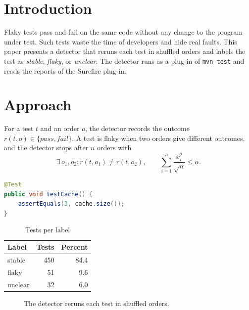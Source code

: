 \section{Introduction}
Flaky tests pass and fail on the same code without any change to the program under test. Such tests waste the
time of developers and hide real faults. This paper presents a detector that reruns each test in shuffled orders
and labels the test as \textit{stable}, \textit{flaky}, or \textit{unclear}. The detector runs as a plug-in of
\texttt{mvn test} and reads the reports of the Surefire plug-in.
\lipsum[1-2]

\section{Approach}
For a test $t$ and an order $o$, the detector records the outcome $r(t, o) \in \{\mathit{pass}, \mathit{fail}\}$.
A test is flaky when two orders give different outcomes, and the detector stops after $n$ orders with
\begin{equation}
\exists\, o_1, o_2 \colon r(t, o_1) \neq r(t, o_2), \qquad \sum_{i=1}^{n} \frac{x_i^2}{\sqrt{n}} \leq \alpha .
\end{equation}
\begin{lstlisting}[language=Java,basicstyle=\ttfamily\footnotesize]
@Test
public void testCache() {
    assertEquals(3, cache.size());
}
\end{lstlisting}
\lipsum[3-4]

\begin{table}[t]
\caption{Tests per label}
\centering
\begin{tabular}{lrr}
\toprule
Label & Tests & Percent \\
\midrule
stable & 450 & 84.4 \\
flaky & 51 & 9.6 \\
unclear & 32 & 6.0 \\
\bottomrule
\end{tabular}
\end{table}

\begin{figure}[t]
\centering
{}
\caption{The detector reruns each test in shuffled orders.}
\end{figure}

